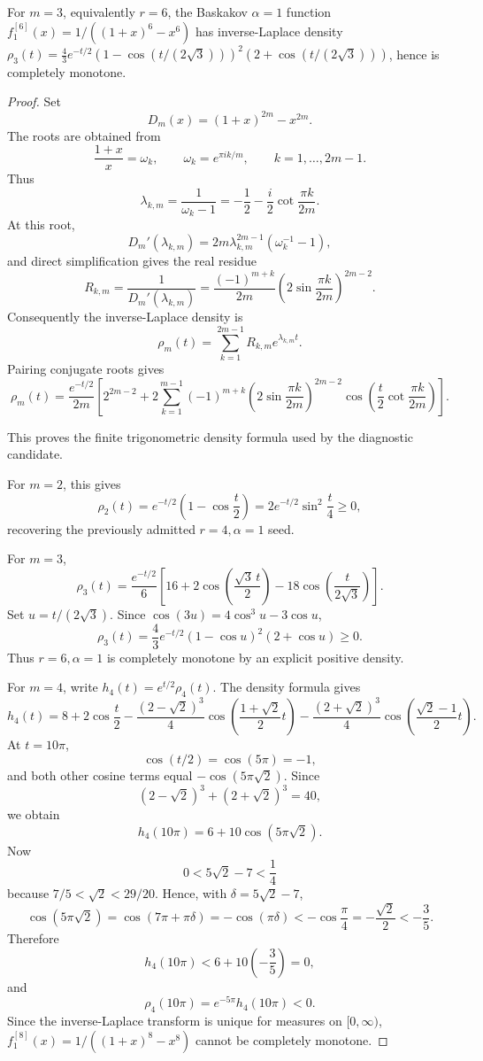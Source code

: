 \begin{lemma}
\label{res:baskakov-alpha1-r6-positive-density-factorization}
For \(m=3\), equivalently \(r=6\), the Baskakov \(\alpha=1\) function \(f^{[6]}_1(x)=1/((1+x)^6-x^6)\) has inverse-Laplace density \(\rho_3(t)=\frac{4}{3}e^{-t/2}(1-\cos(t/(2\sqrt3)))^2(2+\cos(t/(2\sqrt3)))\), hence is completely monotone.
\end{lemma}
\begin{proof}
Set
\[
D_m(x)=(1+x)^{2m}-x^{2m}.
\]
The roots are obtained from
\[
\frac{1+x}{x}=\omega_k,\qquad
\omega_k=e^{\pi i k/m},\qquad k=1,\ldots,2m-1.
\]
Thus
\[
\lambda_{k,m}
=\frac{1}{\omega_k-1}
=-\frac12-\frac{i}{2}\cot\frac{\pi k}{2m}.
\]
At this root,
\[
D_m'(\lambda_{k,m})
=2m\lambda_{k,m}^{2m-1}(\omega_k^{-1}-1),
\]
and direct simplification gives the real residue
\[
R_{k,m}
=\frac{1}{D_m'(\lambda_{k,m})}
=\frac{(-1)^{m+k}}{2m}
\left(2\sin\frac{\pi k}{2m}\right)^{2m-2}.
\]
Consequently the inverse-Laplace density is
\[
\rho_m(t)
=\sum_{k=1}^{2m-1}R_{k,m}e^{\lambda_{k,m}t}.
\]
Pairing conjugate roots gives
\[
\rho_m(t)
=\frac{e^{-t/2}}{2m}
\left[
2^{2m-2}
+2\sum_{k=1}^{m-1}
(-1)^{m+k}
\left(2\sin\frac{\pi k}{2m}\right)^{2m-2}
\cos\!\left(
\frac{t}{2}\cot\frac{\pi k}{2m}
\right)
\right].
\]

This proves the finite trigonometric density formula used by the diagnostic
candidate.

For \(m=2\), this gives
\[
\rho_2(t)=e^{-t/2}\left(1-\cos\frac t2\right)
=2e^{-t/2}\sin^2\frac t4\ge0,
\]
recovering the previously admitted \(r=4,\alpha=1\) seed.

For \(m=3\),
\[
\rho_3(t)
=\frac{e^{-t/2}}6
\left[
16+2\cos\left(\frac{\sqrt3\,t}{2}\right)
-18\cos\left(\frac{t}{2\sqrt3}\right)
\right].
\]
Set \(u=t/(2\sqrt3)\).  Since
\(\cos(3u)=4\cos^3u-3\cos u\),
\[
\rho_3(t)
=\frac{4}{3}e^{-t/2}(1-\cos u)^2(2+\cos u)\ge0.
\]
Thus \(r=6,\alpha=1\) is completely monotone by an explicit positive density.

For \(m=4\), write \(h_4(t)=e^{t/2}\rho_4(t)\).  The density formula gives
\[
h_4(t)
=8+2\cos\frac t2
-\frac{(2-\sqrt2)^3}{4}
\cos\left(\frac{1+\sqrt2}{2}t\right)
-\frac{(2+\sqrt2)^3}{4}
\cos\left(\frac{\sqrt2-1}{2}t\right).
\]
At \(t=10\pi\),
\[
\cos(t/2)=\cos(5\pi)=-1,
\]
and both other cosine terms equal \(-\cos(5\pi\sqrt2)\).  Since
\[
(2-\sqrt2)^3+(2+\sqrt2)^3=40,
\]
we obtain
\[
h_4(10\pi)=6+10\cos(5\pi\sqrt2).
\]
Now
\[
0<5\sqrt2-7<\frac14
\]
because \(7/5<\sqrt2<29/20\).  Hence, with
\(\delta=5\sqrt2-7\),
\[
\cos(5\pi\sqrt2)=\cos(7\pi+\pi\delta)=-\cos(\pi\delta)
<-\cos\frac\pi4=-\frac{\sqrt2}{2}<-\frac35.
\]
Therefore
\[
h_4(10\pi)<6+10\left(-\frac35\right)=0,
\]
and
\[
\rho_4(10\pi)=e^{-5\pi}h_4(10\pi)<0.
\]
Since the inverse-Laplace transform is unique for measures on
\([0,\infty)\), \(f^{[8]}_1(x)=1/((1+x)^8-x^8)\) cannot be completely monotone.
\end{proof}

